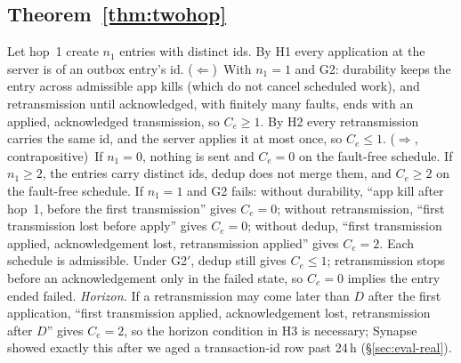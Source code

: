 \subsection{Theorem~\ref{thm:twohop}}
Let hop~1 create $n_1$ entries with distinct ids. By H1 every application at the server is of an outbox entry's id.
($\Leftarrow$)~With $n_1{=}1$ and G2: durability keeps the entry across admissible app kills (which do not cancel scheduled work), and retransmission until acknowledged, with finitely many
faults, ends with an applied, acknowledged transmission, so $C_e\ge1$. By H2 every retransmission carries the same id, and the server applies it at most once, so $C_e\le1$.
($\Rightarrow$, contrapositive)~If $n_1{=}0$, nothing is sent and $C_e=0$ on the fault-free schedule. If $n_1\ge2$, the entries carry distinct ids, dedup does not merge them, and
$C_e\ge2$ on the fault-free schedule. If $n_1{=}1$ and G2 fails: without durability, ``app kill after hop~1, before the first transmission'' gives $C_e=0$; without retransmission,
``first transmission lost before apply'' gives $C_e=0$; without dedup, ``first transmission applied, acknowledgement lost, retransmission applied'' gives $C_e=2$. Each schedule is admissible.
Under G2$'$, dedup still gives $C_e\le1$; retransmission stops before an acknowledgement only in the failed state, so $C_e=0$ implies the entry ended failed.
\emph{Horizon.} If a retransmission may come later than $D$ after the first application, ``first transmission applied, acknowledgement lost, retransmission after $D$'' gives $C_e=2$,
so the horizon condition in H3 is necessary; Synapse showed exactly this after we aged a transaction-id row past 24\,h (\S\ref{sec:eval-real}).

